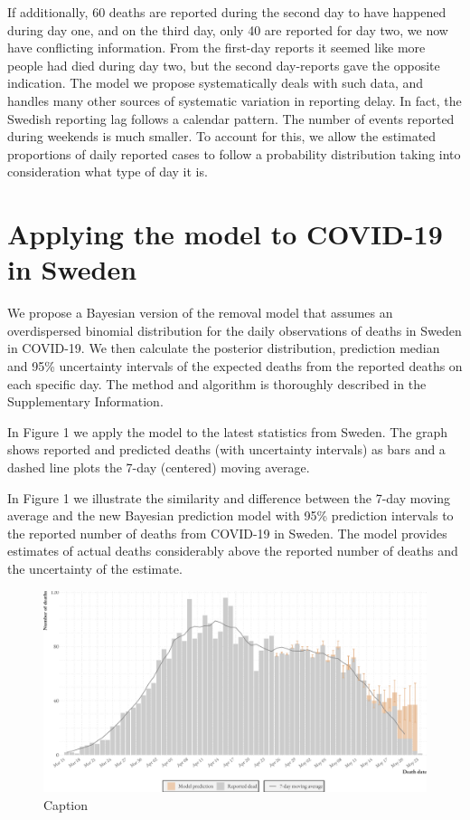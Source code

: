 \documentclass[a4paper,11pt,article,oneside,openany,american]{memoir}
\begin{document}
If additionally, 60 deaths are reported during the second day to have happened during day one, and on the third day, only 40 are reported for day two, we now have conflicting information. From the first-day reports it seemed like more people had died during day two, but the second day-reports gave the opposite indication. The model we propose systematically deals with such data, and handles many other sources of systematic variation in reporting delay. In fact, the Swedish reporting lag follows a calendar pattern. The number of events reported during weekends is much smaller. To account for this, we allow the estimated proportions of daily reported cases to follow a probability distribution taking into consideration what type of day it is.

\chapter{Applying the model to COVID-19 in Sweden}
We propose a Bayesian version of the removal model that assumes an overdispersed binomial distribution for the daily observations of deaths in Sweden in COVID-19. We then calculate the posterior distribution, prediction median and 95\% uncertainty intervals of the expected deaths from the reported deaths on each specific day. The method and algorithm is thoroughly described in the Supplementary Information.

In Figure 1 we apply the model to the latest statistics from Sweden. The graph shows reported and predicted deaths (with uncertainty intervals) as bars and a dashed line plots the 7-day (centered) moving average.

In Figure 1 we illustrate the similarity and difference between the 7-day moving average and the new Bayesian prediction model with 95\% prediction intervals to the reported number of deaths from COVID-19 in Sweden. The model provides estimates of actual deaths considerably above the reported number of deaths and the uncertainty of the estimate.

\begin{figure}
    \centering
    \includegraphics[width=\textwidth]{../plots/latest_prediction}
    \caption{Caption}
    \label{fig:latest_prediction}
\end{figure}
\end{document}
